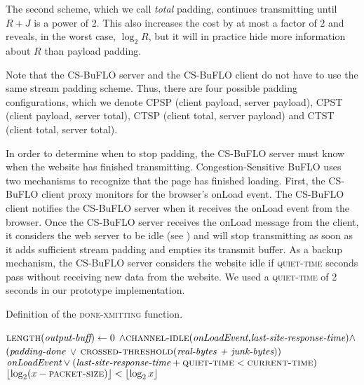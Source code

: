 \documentclass[10pt,journal]{IEEEtran}
\newcommand{\packetsize}{{\sc\textsc{packet-size}}\xspace}
\newcommand{\quiettime}{{\sc\textsc{quiet-time}}\xspace}
\newcommand{\csbuflo} {Congestion-Sensitive BuFLO\xspace}
\newcommand{\csb} {CS-BuFLO\xspace}
\begin{document}
The second scheme, which we call \textit{total} padding, continues
transmitting until $R+J$ is a power of $2$.  This also increases the
cost by at most a factor of $2$ and reveals, in the worst case,
$\log_2 R$, but it will in practice hide more information about $R$
than payload padding.

Note that the \csb server and the \csb client do not have to use the
same stream padding scheme.  Thus, there are four possible padding
configurations, which we denote CPSP (client payload, server payload),
CPST (client payload, server total), CTSP (client total, server
payload) and CTST (client total, server total).

In order to determine when to stop padding, the \csb server must know
when the website has finished transmitting.  \csbuflo uses two
mechanisms to recognize that the page has finished loading.  First,
the \csb client proxy monitors for the browser's onLoad event.  The
\csb client notifies the \csb server when it receives the onLoad event
from the browser.  Once the \csb server receives the onLoad message
from the client, it considers the web server to be idle (see
) and will stop transmitting as soon as it
adds sufficient stream padding and empties its transmit buffer.  As a
backup mechanism, the \csb server considers the website idle if
\quiettime seconds pass without receiving new data from the website.
We used a \quiettime of 2 seconds in our prototype implementation.





\begin{algorithm}[t]
  \caption{Definition of the \textsc{done-xmitting} function.}
  \label{alg:csbuflo-helpers}
  \begin{algorithmic}
      \State \Return $\Call{length}{\emph{output-buff}} \gets 0$  $\wedge\Call{channel-idle}{\emph{onLoadEvent,last-site-response-time}} \wedge $ $(\emph{padding-done} $ $\vee 
      $ $\Call{crossed-threshold}{\emph{real-bytes + junk-bytes}})$
    \EndFunction
    \\
      \State\Return $\emph{onLoadEvent} \vee (\emph{last-site-response-time} + \quiettime<\Call{current-time}{})$
    \EndFunction
    \\
      \State\Return $\lfloor\log_2 (x-\packetsize)\rfloor<\lfloor\log_2 x\rfloor$
    \EndFunction

  \end{algorithmic}
\end{algorithm}
\end{document}
